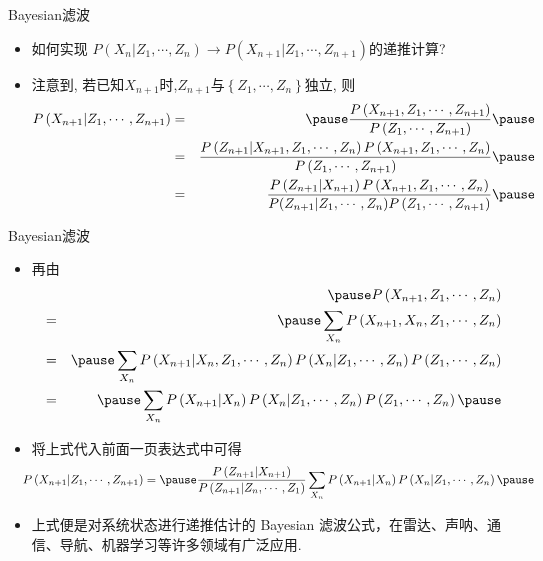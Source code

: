 \begin{frame}{{\rm Bayesian}滤波}
\begin{itemize}[<+-|alert@+>]
	\item 如何实现 $P\left(X_{n} | Z_{1}, \cdots, Z_{n}\right) \longrightarrow P\left(X_{n+1} | Z_{1}, \cdots, Z_{n+1}\right)$的递推计算?
	\item 注意到, 若已知$X_{n+1}$时,$Z_{n+1}$与$\left\{Z_{1}, \cdots, Z_{n}\right\}$独立, 则
	{\small\begin{eqnarray*}
		P\left(X_{n+1} | Z_{1}, \cdots, Z_{n+1}\right)&=&\pause \frac{P\left(X_{n+1}, Z_{1}, \cdots, Z_{n+1}\right)}{P\left(Z_{1}, \cdots, Z_{n+1}\right)}\pause\\
		&=&\frac{P\left(Z_{n+1} | X_{n+1}, Z_{1}, \cdots, Z_{n}\right) P\left(X_{n+1}, Z_{1}, \cdots, Z_{n}\right)}{P\left(Z_{1}, \cdots, Z_{n+1}\right)}\pause\\
	&=&\frac{P\left(Z_{n+1} | X_{n+1}\right) P\left(X_{n+1}, Z_{1}, \cdots, Z_{n}\right)}{P(Z_{n+1}|Z_{1}, \cdots, Z_n)P\left(Z_{1}, \cdots, Z_{n+1}\right)}\pause
	\end{eqnarray*}}




\end{itemize}



\end{frame}

\begin{frame}{{\rm Bayesian}滤波}
	\begin{itemize}[<+-|alert@+>]
		\item 再由\pause
		{\small \begin{eqnarray*}
			&&\pause P\left(X_{n+1}, Z_{1}, \cdots, Z_{n}\right)\\
			 &=&\pause\sum_{X_{n}} P\left(X_{n+1}, X_{n}, Z_{1}, \cdots, Z_{n}\right) \\
			&=&\pause\sum_{X_{n}} P\left(X_{n+1} | X_{n}, Z_{1}, \cdots, Z_{n}\right) P\left(X_{n} | Z_{1}, \cdots, Z_{n}\right) P\left(Z_{1}, \cdots, Z_{n}\right) \\
			& =&\pause\sum_{X_{n}} P\left(X_{n+1} | X_{n}\right) P\left(X_{n} | Z_{1}, \cdots, Z_{n}\right) P\left(Z_{1}, \cdots, Z_{n}\right)\pause
		\end{eqnarray*}}
	    \item 将上式代入前面一页表达式中可得
	{\small \[
		\hspace{-0.3cm} P\left(X_{n+1} | Z_{1}, \cdots, Z_{n+1}\right)=\pause\frac{P\left(Z_{n+1} | X_{n+1}\right)}{P\left(Z_{n+1} | Z_{n}, \cdots, Z_{1}\right)} \sum_{X_{n}} P\left(X_{n+1} | X_{n}\right) P\left(X_{n} | Z_{1}, \cdots, Z_{n}\right)
		\pause\]}
		\item 上式便是对系统状态进行递推估计的 Bayesian 滤波公式，在雷达、声呐、通信、导航、机器学习等许多领域有广泛应用.

	\end{itemize}






	\end{frame}
